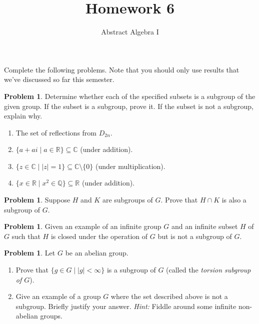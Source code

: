 \documentclass[11pt]{scrartcl}
\theoremstyle{definition}
\newtheorem{problem}[theorem]{Problem}
\begin{document}
\title{Homework 6}
\subtitle{Abstract Algebra I}
\date{}

\maketitle
\thispagestyle{fancy}

Complete the following problems. Note that you should only use results that we've discussed so far this semester. 

\begin{problem}
Determine whether each of the specified subsets is a subgroup of the given group. If the subset is a subgroup, prove it.  If the subset is not a subgroup, explain why.
\begin{enumerate}[label=\rm{(\alph*)}]
\item The set of reflections from $D_{2n}$.
\item $\{a+ai\mid a\in\mathbb{R}\}\subseteq\mathbb{C}$ (under addition).
\item $\{z\in\mathbb{C}\mid |z|=1\}\subseteq\mathbb{C}\setminus\{0\}$ (under multiplication).
\item $\{x\in\mathbb{R}\mid x^2\in\mathbb{Q}\}\subseteq\mathbb{R}$ (under addition).
\end{enumerate}
\end{problem}

\begin{problem}
Suppose $H$ and $K$ are subgroups of $G$.  Prove that $H\cap K$ is also a subgroup of $G$.
\end{problem}

\begin{problem}
Given an example of an infinite group $G$ and an infinite subset $H$ of $G$ such that $H$ is closed under the operation of $G$ but is not a subgroup of $G$.
\end{problem}

\begin{problem}
Let $G$ be an abelian group.  
\begin{enumerate}[label=\rm{(\alph*)}]
\item Prove that $\{g\in G\mid |g|<\infty\}$ is a subgroup of $G$ (called the \emph{torsion subgroup of $G$}).  
\item Give an example of a group $G$ where the set described above is not a subgroup. Briefly justify your answer.  \emph{Hint:}  Fiddle around some infinite non-abelian groups.
\end{enumerate} 
\end{problem}
\end{document}
